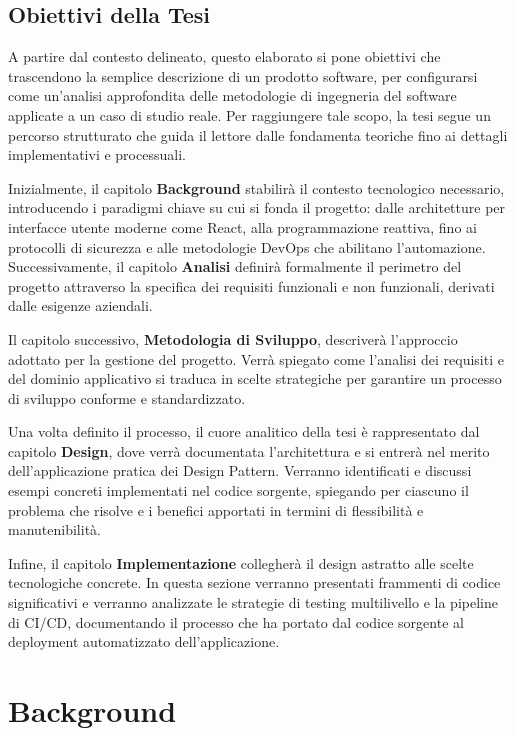 \documentclass[12pt,a4paper,openright,twoside]{book}
\begin{document}
\section{Obiettivi della Tesi}
\label{sec:obiettivi_tesi}

A partire dal contesto delineato, questo elaborato si pone obiettivi che trascendono la semplice descrizione di un prodotto software, per configurarsi come un'analisi approfondita delle metodologie di ingegneria del software applicate a un caso di studio reale. Per raggiungere tale scopo, la tesi segue un percorso strutturato che guida il lettore dalle fondamenta teoriche fino ai dettagli implementativi e processuali.

Inizialmente, il capitolo \textbf{Background} stabilirà il contesto tecnologico necessario, introducendo i paradigmi chiave su cui si fonda il progetto: dalle architetture per interfacce utente moderne come React, alla programmazione reattiva, fino ai protocolli di sicurezza e alle metodologie DevOps che abilitano l'automazione. Successivamente, il capitolo \textbf{Analisi} definirà formalmente il perimetro del progetto attraverso la specifica dei requisiti funzionali e non funzionali, derivati dalle esigenze aziendali.

Il capitolo successivo, \textbf{Metodologia di Sviluppo}, descriverà l'approccio adottato per la gestione del progetto. Verrà spiegato come l'analisi dei requisiti e del dominio applicativo si traduca in scelte strategiche per garantire un processo di sviluppo conforme e standardizzato.

Una volta definito il processo, il cuore analitico della tesi è rappresentato dal capitolo \textbf{Design}, dove verrà documentata l'architettura e si entrerà nel merito dell'applicazione pratica dei Design Pattern. Verranno identificati e discussi esempi concreti implementati nel codice sorgente, spiegando per ciascuno il problema che risolve e i benefici apportati in termini di flessibilità e manutenibilità.

Infine, il capitolo \textbf{Implementazione} collegherà il design astratto alle scelte tecnologiche concrete. In questa sezione verranno presentati frammenti di codice significativi e verranno analizzate le strategie di testing multilivello e la pipeline di CI/CD, documentando il processo che ha portato dal codice sorgente al deployment automatizzato dell'applicazione.

\chapter{Background}
\label{chap:background}
\end{document}
